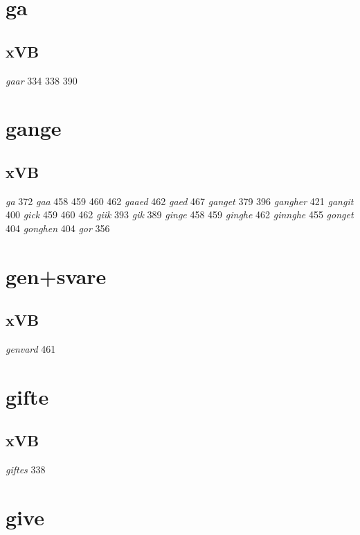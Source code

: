\documentclass[a4paper,twocolumn]{article}
\begin{document}
\section{ga}
\label{sec:org697233a}
\subsection{xVB}
\label{sec:orgef6ff52}
\emph{gaar} 334 338 390 
\section{gange}
\label{sec:org6a84621}
\subsection{xVB}
\label{sec:org73912a9}
\emph{ga} 372 \emph{gaa} 458 459 460 462 \emph{gaaed} 462 \emph{gaed} 467 \emph{ganget} 379 396 \emph{gangher} 421 \emph{gangit} 400 \emph{gick} 459 460 462 \emph{giik} 393 \emph{gik} 389 \emph{ginge} 458 459 \emph{ginghe} 462 \emph{ginnghe} 455 \emph{gonget} 404 \emph{gonghen} 404 \emph{gor} 356 
\section{gen+svare}
\label{sec:org781e814}
\subsection{xVB}
\label{sec:org059ff14}
\emph{genvard} 461 
\section{gifte}
\label{sec:org439deb3}
\subsection{xVB}
\label{sec:org69aeeef}
\emph{giftes} 338 
\section{give}
\label{sec:org15f1d51}
\end{document}
